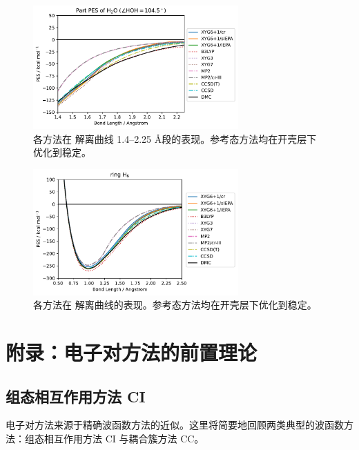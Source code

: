 \begin{figure}[h]
  \centering
  \includegraphics[width=0.7\textwidth]{assets/curve-H2O-part-stab.pdf}
  \caption{各方法在  解离曲线 1.4--2.25 \AA 段的表现。参考态方法均在开壳层下优化到稳定。}
  \label{fig.2.curve-H2O-part-stab}
\end{figure}

\begin{figure}[h]
  \centering
  \includegraphics[width=0.7\textwidth]{assets/curve-H6-stab.pdf}
  \caption{各方法在  解离曲线的表现。参考态方法均在开壳层下优化到稳定。}
  \label{fig.2.curve-H6-stab}
\end{figure}

\newpage

\section{附录：电子对方法的前置理论}

\subsection{组态相互作用方法 CI}

电子对方法来源于精确波函数方法的近似。这里将简要地回顾两类典型的波函数方法：组态相互作用方法 CI 与耦合簇方法 CC。

